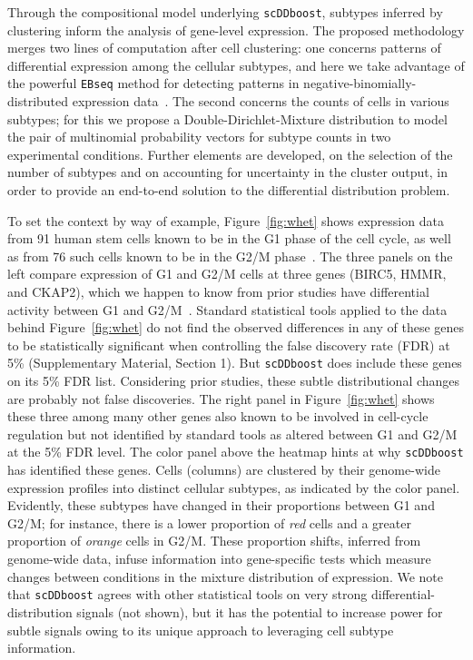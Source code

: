 \documentclass[aoas,preprint]{imsart}
\begin{document}
Through the compositional model underlying \verb+scDDboost+, subtypes inferred by clustering 
inform the analysis of gene-level expression.  The proposed methodology merges two lines of computation
after cell clustering: one concerns patterns of differential expression among 
the cellular subtypes, and here we take advantage of the powerful \verb+EBseq+ method for detecting
patterns in negative-binomially-distributed expression data~\citep{ref:Leng}.  The second concerns 
the counts of cells in various subtypes; for this we propose a Double-Dirichlet-Mixture distribution
to model the pair of multinomial probability vectors for subtype counts in two experimental conditions.
Further elements are developed, on the selection of the number of subtypes and on accounting for uncertainty in the cluster output,  in order to provide an end-to-end solution to the differential distribution
problem.  

To set the context by way of example, 
Figure~\ref{fig:whet} shows expression data from 91 human 
stem cells known to be in the G1 phase of the cell cycle, as well as
from 76 such cells known to be in the G2/M phase~\citep{ref:Leng}.  The three panels on the left compare expression of G1
and G2/M cells at three genes (BIRC5, HMMR, and CKAP2),  which we happen to know from prior studies  have differential activity between G1 and G2/M~\citep{BIRC5,HMMR,RAD21}.  
Standard statistical tools applied to the data behind Figure~\ref{fig:whet} do not find the observed
 differences in any of these genes
to be statistically significant when controlling the false discovery rate (FDR) at 5\% (Supplementary Material, 
Section 1).  But \verb+scDDboost+ does include these genes on its 5\% FDR list.
Considering prior studies, these subtle distributional changes are probably not false discoveries.
The right panel in Figure~\ref{fig:whet} shows these three among
  many other genes also known to be involved in cell-cycle regulation but
not identified by standard tools as altered between G1 and G2/M at the 5\% FDR level.    The color panel above the
heatmap hints at why \verb+scDDboost+ has identified these genes. Cells (columns) are clustered by their genome-wide
expression profiles into distinct cellular subtypes, as indicated by the color panel.   Evidently, these 
subtypes have changed in their proportions between G1 and G2/M; for instance, there is a lower proportion
 of {\em red} cells   and a greater proportion of {\em orange} cells in G2/M. These proportion shifts, 
inferred from genome-wide data, infuse information into gene-specific tests which measure 
changes between conditions in the mixture distribution of expression.  We note that \verb+scDDboost+ 
agrees with other statistical tools on very strong differential-distribution signals (not shown), but it 
has the potential to increase power for subtle signals owing to its unique approach to leveraging cell subtype
information.
\end{document}
